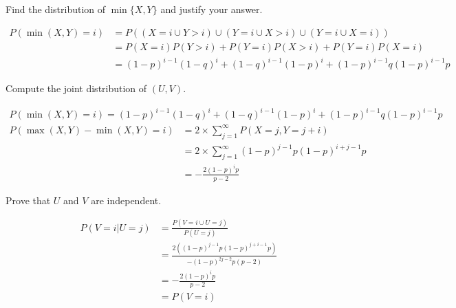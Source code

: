 \documentclass[11pt]{article}
\begin{document}
\newpage
{}

\begin{Parts}
    
    \Part Find the distribution of $\min\{X,Y\}$ and justify your answer.
    \begin{Answer}
        \begin{align*}
            P(\min(X,Y) = i) &= P((X = i \cup Y > i) \cup (Y = i \cup X > i) \cup (Y = i \cup X = i)) \\
                             &= P(X = i)P(Y > i) + P(Y = i)P(X > i) + P(Y = i)P(X = i) \\
                             &= (1 - p)^{i - 1}(1 - q)^i + (1 - q)^{i - 1}(1 - p)^i + (1 - p)^{i - 1}q(1 - p)^{i - 1}p
        \end{align*}
    \end{Answer}    

    \Part Compute the joint distribution of $(U,V)$. 
    \begin{Answer}
        \begin{align*}
            P(\min(X,Y) = i) = (1 - p)^{i - 1}(1 - q)^i + (1 - q)^{i - 1}(1 - p)^i + (1 - p)^{i - 1}q(1 - p)^{i - 1}p
        \end{align*}
        \begin{align*}
            P(\max(X,Y) - \min(X,Y) = i) &= 2 \times \sum_{j = 1}^{\infty}P(X = j, Y = j + i) \\
                                         &= 2 \times \sum_{j = 1}^{\infty}(1 - p)^{j - 1}p(1 - p)^{i + j - 1}p \\
                                         &= -\frac{2(1 - p)^ip}{p - 2}
        \end{align*}
    \end{Answer}

    \Part Prove that $U$ and $V$ are independent.
    \begin{Answer}
        \begin{align*}
            P(V = i | U = j) &= \frac{P(V = i \cup U = j)}{P(U = j)} \\
                             &= \frac{2((1 - p)^{j - 1}p(1 - p)^{j + i - 1}p)}{-(1 - p)^{2j - 2}p(p - 2)} \\
                             &= -\frac{2(1 - p)^ip}{p - 2} \\
                             &= P(V = i)
        \end{align*}
    \end{Answer}
\end{Parts}
\end{document}
